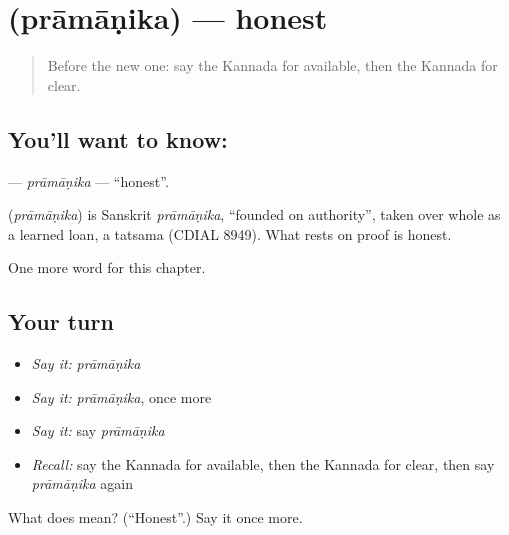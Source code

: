 \section[\texorpdfstring{\kn{ಪ್ರಾಮಾಣಿಕ} (prāmāṇika)}{ಪ್ರಾಮಾಣಿಕ (prāmāṇika)}]{ (prāmāṇika) — honest}

\label{lesson:KA-C218-pramanika}



\begin{quote}
Before the new one: say the Kannada for available, then the Kannada for clear.
\end{quote}

\subsection*{You'll want to know: }
\textbf{} — \emph{prāmāṇika} — \textquotedblleft{}honest\textquotedblright{}.

\begin{cousinweb}
\textbf{} (\emph{prāmāṇika}) is Sanskrit \emph{prāmāṇika}, \textquotedblleft{}founded on authority\textquotedblright{}, taken over whole as a learned loan, a tatsama (CDIAL 8949). What rests on proof is honest.
\end{cousinweb}

\begin{grammarlens}[title={What you've built}]
One more word for this chapter.
\end{grammarlens}

\subsection*{Your turn}
\begin{itemize}
\raggedright
  \item \emph{Say it:} \emph{prāmāṇika}
  \item \emph{Say it:} \emph{prāmāṇika}, once more
  \item \emph{Say it:} say \emph{prāmāṇika}
  \item \emph{Recall:} say the Kannada for available, then the Kannada for clear, then say \emph{prāmāṇika} again
\end{itemize}

\begin{tcolorbox}[breakable,colback=teal!4,colframe=teal!35!black,title={Before you move on}]
What does  mean? (\textquotedblleft{}Honest\textquotedblright{}.) Say it once more.
\end{tcolorbox}
